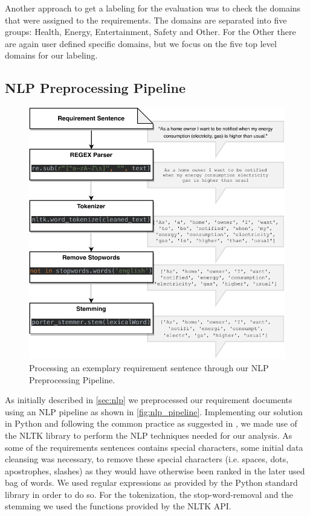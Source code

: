 Another approach to get a labeling for the evaluation was to check the domains that were assigned to the requirements. The domains are separated into five groups: Health, Energy, Entertainment, Safety and Other. For the \grqq{}Other\grqq{} there are again user defined specific domains, but we focus on the five top level domains for our labeling.

\subsection{NLP Preprocessing Pipeline} %
\label{sub:own_pipeline}

\begin{figure}[ht]
  \centering
    \includegraphics[width=\textwidth]{figures/NLP Pipeline.pdf}
    \caption{Processing an exemplary requirement sentence through our NLP Preprocessing Pipeline.}
    \label{fig:nlp_pipeline}
\end{figure}

As initially described in \autoref{sec:nlp} we preprocessed our requirement documents using an NLP pipeline as shown in \autoref{fig:nlp_pipeline}. Implementing our solution in Python and following the common practice as suggested in \cite{ferrari_natural_2018}, we made use of the NLTK library \cite{nltk_library} to perform the NLP techniques needed for our analysis. As some of the requirements sentences contains special characters, some initial data cleansing was necessary, to remove these special characters (i.e. spaces, dots, apostrophes, slashes) as they would have otherwise been ranked in the later used bag of words. We used regular expressions as provided by the Python standard library in order to do so. For the tokenization, the stop-word-removal and the stemming we used the functions provided by the NLTK API.

